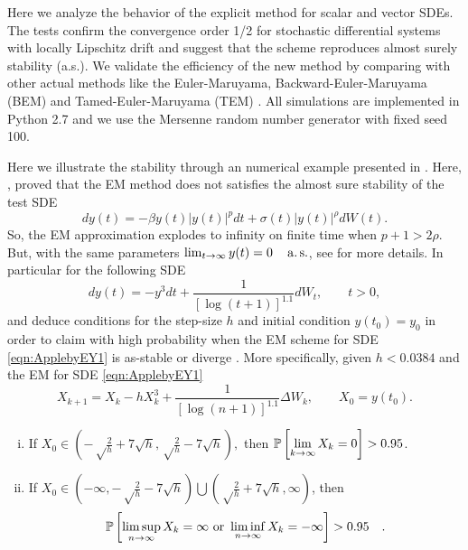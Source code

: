 Here we analyze the behavior of the explicit \SM method for scalar and vector SDEs. 
The tests confirm the convergence order 1/2 for stochastic differential systems with locally Lipschitz drift 
and suggest that the \SM scheme reproduces almost surely stability (a.s.). We validate the efficiency of the new 
method  by comparing with other actual methods like the Euler-Maruyama, Backward-Euler-Maruyama (BEM) \cite{Mao2013} 
and Tamed-Euler-Maruyama (TEM) \cite{Hutzenthaler2012a}. All simulations are implemented in Python 2.7 and we use the 
Mersenne random number generator with fixed seed 100.
	
\begin{example}

		Here we illustrate the stability  through an numerical example presented in 
	\cite[sec 7, pg. 420]{Appleby2010}. Here, \citeauthor{Appleby2010}, proved that the EM method does not satisfies 
	the almost sure stability of the test SDE
	\begin{equation}
	dy(t)= -\beta y(t)|y(t)|^p dt +\sigma(t)|y(t)|^ {\rho} dW(t).
	\end{equation}
	So, the EM approximation explodes to infinity on finite time when $p+1>2\rho$. But, with the same parameters
	$
	\lim_{t \to \infty} y(t)=0 \quad \operatorname*{a.s.}
	$, see \cite{Appleby2008, Appleby2010} for more details.
	In particular for  the following SDE 
	\begin{equation}\label{eqn:ApplebyEY1}
		dy(t) = -y^3 dt 
		+ \frac{1}{\left[\log(t+1)\right]^{1.1}} dW_t, \qquad t>0,
	\end{equation}
	and deduce conditions for the step-size $h$ and initial condition $y(t_0)=y_0$ in order to claim with high 
	probability
	when the EM scheme for SDE \eqref{eqn:ApplebyEY1} is as-stable or diverge \cite[Cor 7.1 pg. 421]{Appleby2010}. 
	More specifically, given $h<\num{0.0384}$ and  the EM for SDE \eqref{eqn:ApplebyEY1}
	\begin{equation}\label{eqn:EMRecurrenceApplbyEY1}
		X_{k+1} = X_k -h X_k^3 
		+\frac{1}{[\log(n+1)]^{1.1}} \Delta W_k, \qquad X_0=y(t_0).
	\end{equation}
	\begin{enumerate}[(i)]
		\item
		If $
		\displaystyle
		X_0\in \left(
		-\sqrt\frac{2}{h} + 7 \sqrt h,
		\sqrt\frac{2}{h} - 7 \sqrt h
		\right),
		$
		then
		$
		\displaystyle
		\mathbb{P}\left[
			\lim_{k\to\infty}
			X_k = 0
		\right]>0.95
		$\quad.
		\item  
		If 
		$
		\displaystyle
		X_0\in \left(
		-\infty,
		-\sqrt\frac{2}{h} - 7 \sqrt h
		\right)
		\bigcup
		\left(
		\sqrt\frac{2}{h} + 7 \sqrt h,
		\infty
		\right)
		$,
		then 
		$$
		\displaystyle
		\mathbb{P}\left[
			\limsup_{n\to\infty}
			X_k = \infty
			\text{ or }
			\liminf_{n\to\infty}
			X_k = -\infty
		\right]>0.95 \quad.
		$$
		

\end{enumerate}
\end{example}

